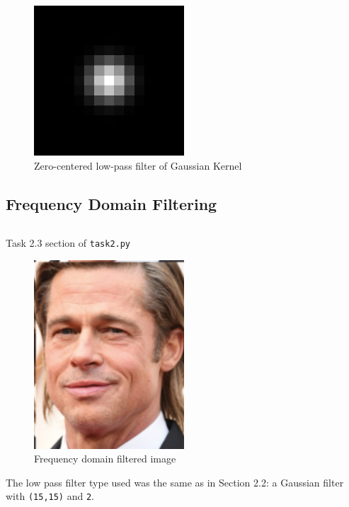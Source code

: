 \documentclass[a4paper]{article}
\newenvironment{code}{\captionsetup{type=listing}}{}
\begin{document}
\begin{figure}[H]
    \centering
    \includegraphics[width=0.5\textwidth]{../code/task2/output/2_frequency_domain_low-pass_filter.jpg}
    \caption{Zero-centered low-pass filter of Gaussian Kernel}
\end{figure}

\subsection{Frequency Domain Filtering}
\begin{code}
\inputminted[firstline=31, lastline=70, linenos, breaklines, frame=single]{python}{../code/task2/task2.py}
\caption{Task 2.3 section of \texttt{task2.py}}
\end{code}

\begin{figure}[H]
    \centering
    \includegraphics[width=0.5\textwidth]{../code/task2/output/3_filtered_color_image.jpg}
    \caption{Frequency domain filtered image}
\end{figure}

The low pass filter type used was the same as in Section 2.2: a Gaussian filter with \texttt{(15,15)} and \texttt{2}.
\end{document}
